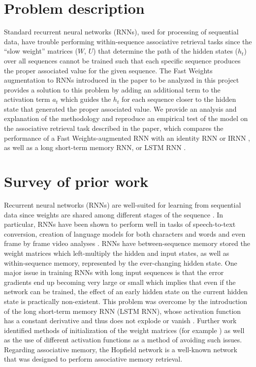 \section{Problem description}

Standard recurrent neural networks (RNNs), used for processing of sequential data, have trouble performing within-sequence associative retrieval tasks since the ``slow weight'' matrices ($W$, $U$) that determine the path of the hidden states ($h_t$) over all sequences cannot be trained such that each specific sequence produces the proper associated value for the given sequence. The Fast Weights augmentation to RNNs introduced in the paper to be analyzed in this project \cite{DBLP:conf/nips/BaHMLI16} provides a solution to this problem by adding an additional term to the activation term $a_t$ which guides the $h_t$ for each sequence closer to the hidden state that generated the proper associated value. We provide an analysis and explanation of the methodology and reproduce an empirical test of the model on the associative retrieval task described in the paper, which compares the performance of a Fast Weights-augmented RNN with an identity RNN or IRNN \cite{DBLP:journals/corr/LeJH15}, as well as a long short-term memory RNN, or LSTM RNN \cite{DBLP:journals/neco/HochreiterS97}.

\section{Survey of prior work}

Recurrent neural networks (RNNs) are well-suited for learning from sequential data since weights are shared among different stages of the sequence \cite[p. 373]{Goodfellow-et-al-2016}. In particular, RNNs have been shown to perform well in tasks of speech-to-text conversion, creation of language models for both characters and words \cite{DBLP:conf/icml/SutskeverMH11} and even frame by frame video analyses \cite{mnih}. RNNs have between-sequence memory stored the weight matrices which left-multiply the hidden and input states, as well as within-sequence memory, represented by the ever-changing hidden state. One major issue in training RNNs with long input sequences is that the error gradients end up becoming very large or small \cite[p. 16]{DBLP:journals/nn/Schmidhuber15} which implies that even if the network can be trained, the effect of an early hidden state on the current hidden state is practically non-existent. This problem was overcome by the introduction of the long short-term memory RNN (LSTM RNN), whose activation function has a constant derivative and thus does not explode or vanish \cite[p. 19]{DBLP:journals/nn/Schmidhuber15}. Further work identified methods of initialization of the weight matrices (for example \citealt{DBLP:journals/corr/LeJH15}) as well as the use of different activation functions as a method of avoiding such issues. Regarding associative memory, the Hopfield network \cite[p. 690-703]{Haykin:2009:NNC:1213811} is a well-known network that was designed to perform associative memory retrieval.

